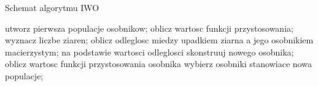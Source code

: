 \begin{algorithm}[H]
\caption{Schemat algorytmu IWO}
\begin{algorithmic}
\State utworz pierwsza populacje osobnikow;
        \State oblicz wartosc funkcji przystosowania;
\EndFor
{}
        \State wyznacz liczbe ziaren;
			\State oblicz odleglosc miedzy upadkiem ziarna a jego osobnikiem macierzystym;
			\State na podstawie wartosci odleglosci skonstruuj nowego osobnika;
			\State oblicz wartosc funkcji przystosowania osobnika
		\EndFor
	\EndFor
	\State wybierz osobniki stanowiace nowa populacje;
\EndWhile

\end{algorithmic}
\end{algorithm}